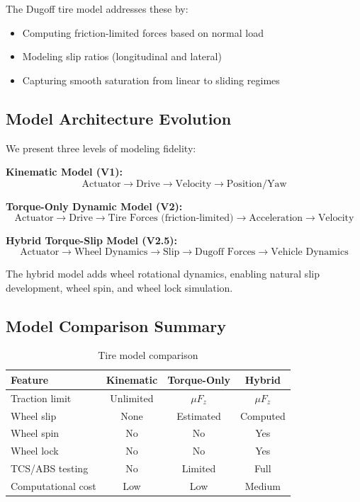 \documentclass[11pt,a4paper]{article}
\begin{document}
The Dugoff tire model addresses these by:
\begin{itemize}
    \item Computing friction-limited forces based on normal load
    \item Modeling slip ratios (longitudinal and lateral)
    \item Capturing smooth saturation from linear to sliding regimes
\end{itemize}

\subsection{Model Architecture Evolution}

We present three levels of modeling fidelity:

\textbf{Kinematic Model (V1):}
\begin{equation}
\text{Actuator} \to \text{Drive} \to \text{Velocity} \to \text{Position/Yaw}
\end{equation}

\textbf{Torque-Only Dynamic Model (V2):}
\begin{equation}
\text{Actuator} \to \text{Drive} \to \boxed{\text{Tire Forces (friction-limited)}} \to \text{Acceleration} \to \text{Velocity}
\end{equation}

\textbf{Hybrid Torque-Slip Model (V2.5):}
\begin{equation}
\text{Actuator} \to \boxed{\text{Wheel Dynamics}} \to \boxed{\text{Slip}} \to \boxed{\text{Dugoff Forces}} \to \text{Vehicle Dynamics}
\end{equation}

The hybrid model adds wheel rotational dynamics, enabling natural slip development, wheel spin, and wheel lock simulation.

\subsection{Model Comparison Summary}

\begin{table}[H]
\centering
\begin{tabular}{lccc}
\toprule
\textbf{Feature} & \textbf{Kinematic} & \textbf{Torque-Only} & \textbf{Hybrid} \\
\midrule
Traction limit & Unlimited & $\mu F_z$ & $\mu F_z$ \\
Wheel slip & None & Estimated & Computed \\
Wheel spin & No & No & Yes \\
Wheel lock & No & No & Yes \\
TCS/ABS testing & No & Limited & Full \\
Computational cost & Low & Low & Medium \\
\bottomrule
\end{tabular}
\caption{Tire model comparison}
\end{table}
\end{document}
